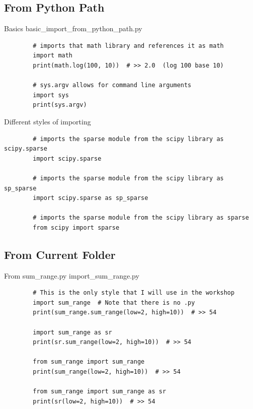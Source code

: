 \documentclass[11pt]{beamer}
\begin{document}
\subsection{From Python Path}
\begin{frame}[fragile]{Basics}
	basic\_import\_from\_python\_path.py
	\begin{lstlisting}
		# imports that math library and references it as math
		import math
		print(math.log(100, 10))  # >> 2.0  (log 100 base 10)
		
		# sys.argv allows for command line arguments
		import sys
		print(sys.argv)
	\end{lstlisting}
\end{frame}
		
\begin{frame}[fragile]{Different styles of importing}
	\begin{lstlisting}
		# imports the sparse module from the scipy library as scipy.sparse
		import scipy.sparse
		
		# imports the sparse module from the scipy library as sp_sparse
		import scipy.sparse as sp_sparse
		
		# imports the sparse module from the scipy library as sparse
		from scipy import sparse
	\end{lstlisting}
\end{frame}

\subsection{From Current Folder}
\begin{frame}[fragile]{From sum\_range.py}
	import\_sum\_range.py
	\begin{lstlisting}
		# This is the only style that I will use in the workshop
		import sum_range  # Note that there is no .py
		print(sum_range.sum_range(low=2, high=10))  # >> 54
		
		import sum_range as sr
		print(sr.sum_range(low=2, high=10))  # >> 54
		
		from sum_range import sum_range
		print(sum_range(low=2, high=10))  # >> 54
		
		from sum_range import sum_range as sr
		print(sr(low=2, high=10))  # >> 54
	\end{lstlisting}
\end{frame}
\end{document}
